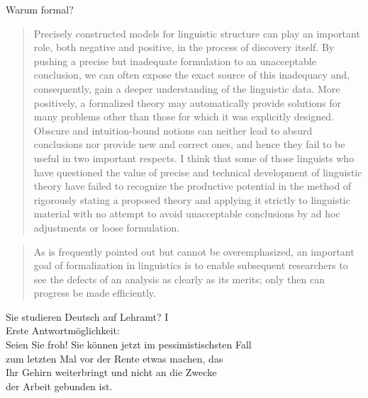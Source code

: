 \begin{frame}
  {Warum formal?}
  \onslide<+->
  \onslide<+->
  \begin{quote}\small
    Precisely constructed models for linguistic structure can play an
    important role, both negative and positive, in the process of discovery 
    itself. By pushing a precise but inadequate formulation to
    an unacceptable conclusion, we can often \alert{expose the exact source
    of this inadequacy and, consequently, gain a deeper understanding}
    of the linguistic data. More positively, a formalized theory may 
    \alert{automatically provide solutions for many problems other than those
    for which it was explicitly designed}. Obscure and intuition-bound
    notions can neither lead to absurd conclusions nor provide new and
    correct ones, and hence they fail to be useful in two important respects. 
    I think that some of those linguists who have questioned
    the value of precise and technical development of linguistic theory
    have failed to recognize the productive potential in the method
    of rigorously stating a proposed theory and applying it strictly to
    linguistic material with no attempt to avoid unacceptable conclusions by ad hoc adjustments or loose formulation.
\citep[S.\,5]{Chomsky57a}
  \end{quote}   
  \onslide<+->
  \Halbzeile
  \begin{quote}\small
    As is frequently pointed out but cannot be overemphasized, an important goal
    of formalization in linguistics is to \alert{enable subsequent researchers to see the defects
    of an analysis as clearly as its merits}; only then can progress be made efficiently.
    \citep[S.\,322]{Dowty79a}
  \end{quote}
\end{frame}

\begin{frame}
  {Sie studieren Deutsch auf Lehramt? I}
  \onslide<+->
  \onslide<+->
  \centering 
  \\
  \onslide<+->
  \Zeile
  \Large Erste Antwortmöglichkeit:\\
  \onslide<+->
  \Halbzeile
  \alert{Seien Sie froh!} Sie können jetzt im pessimistischsten Fall\\
  zum letzten Mal vor der Rente etwas machen, das \\
  Ihr Gehirn weiterbringt und nicht an die Zwecke \\
  der Arbeit gebunden ist.\\
  \onslide<+->
  \Halbzeile
  \normalsize
\end{frame}


